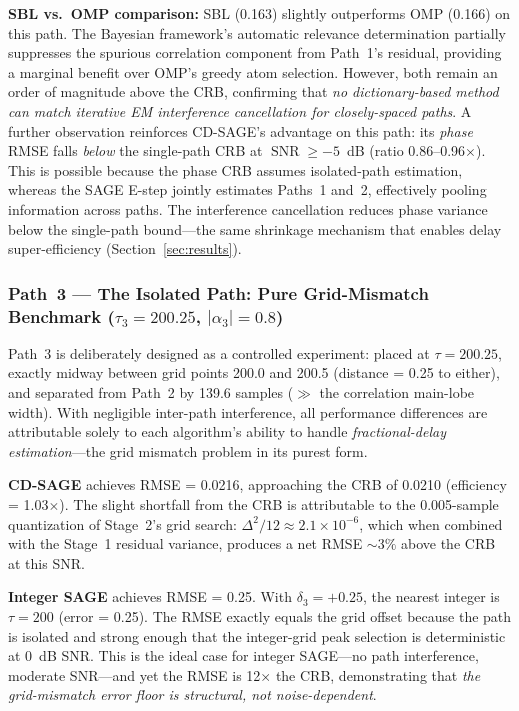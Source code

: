 \documentclass[journal]{IEEEtran}
\DeclareMathOperator{\SNR}{SNR}
\begin{document}
\textbf{SBL vs.\ OMP comparison:} SBL (0.163) slightly outperforms OMP (0.166) on this path. The Bayesian framework's automatic relevance determination partially suppresses the spurious correlation component from Path~1's residual, providing a marginal benefit over OMP's greedy atom selection. However, both remain an order of magnitude above the CRB, confirming that \textit{no dictionary-based method can match iterative EM interference cancellation for closely-spaced paths}. A further observation reinforces CD-SAGE's advantage on this path: its \textit{phase} RMSE falls \textit{below} the single-path CRB at $\SNR \ge -5$~dB (ratio 0.86--0.96$\times$). This is possible because the phase CRB assumes isolated-path estimation, whereas the SAGE E-step jointly estimates Paths~1 and~2, effectively pooling information across paths. The interference cancellation reduces phase variance below the single-path bound---the same shrinkage mechanism that enables delay super-efficiency (Section~\ref{sec:results}).

\subsubsection{Path~3 --- The Isolated Path: Pure Grid-Mismatch Benchmark ($\tau_3 = 200.25$, $|\alpha_3| = 0.8$)}

Path~3 is deliberately designed as a controlled experiment: placed at $\tau = 200.25$, exactly midway between grid points 200.0 and 200.5 (distance = 0.25 to either), and separated from Path~2 by 139.6 samples ($\gg$ the correlation main-lobe width). With negligible inter-path interference, all performance differences are attributable solely to each algorithm's ability to handle \textit{fractional-delay estimation}---the grid mismatch problem in its purest form.

\textbf{CD-SAGE} achieves RMSE = 0.0216, approaching the CRB of 0.0210 (efficiency = 1.03$\times$). The slight shortfall from the CRB is attributable to the 0.005-sample quantization of Stage~2's grid search: $\Delta^2/12 \approx 2.1\times 10^{-6}$, which when combined with the Stage~1 residual variance, produces a net RMSE $\sim 3\%$ above the CRB at this SNR.

\textbf{Integer SAGE} achieves RMSE = 0.25. With $\delta_3 = +0.25$, the nearest integer is $\tau = 200$ (error = 0.25). The RMSE exactly equals the grid offset because the path is isolated and strong enough that the integer-grid peak selection is deterministic at 0~dB SNR. This is the ideal case for integer SAGE---no path interference, moderate SNR---and yet the RMSE is 12$\times$ the CRB, demonstrating that \textit{the grid-mismatch error floor is structural, not noise-dependent}.
\end{document}

